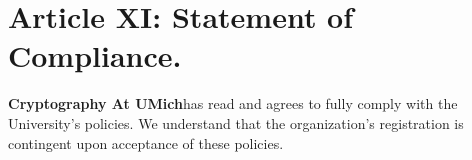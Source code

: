 \documentclass[11pt]{article}
\newcommand{\orgname}{\textbf{Cryptography At UMich}}
\begin{document}
    \section{Article XI: Statement of Compliance.}
    \orgname has read and agrees to fully comply with the University's policies.
    We understand that the organization's registration is contingent upon acceptance of these policies.
\end{document}
